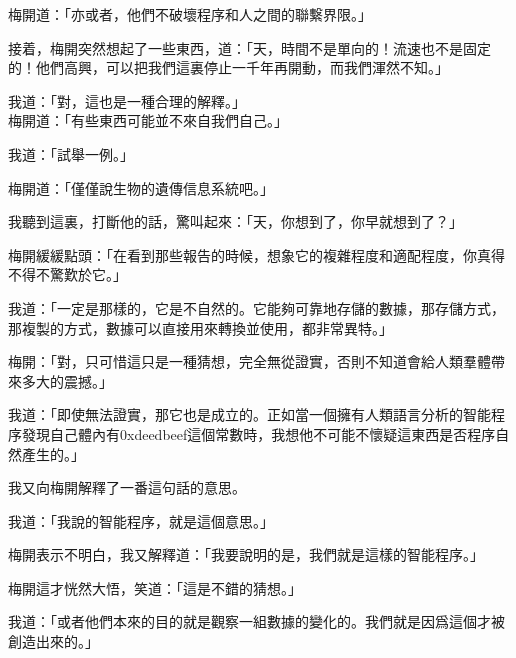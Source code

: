 梅開道：「亦或者，他們不破壞程序和人之間的聯繫界限。」

接着，梅開突然想起了一些東西，道：「天，時間不是單向的！流速也不是固定的！他們高興，可以把我們這裏停止一千年再開動，而我們渾然不知。」

我道：「對，這也是一種合理的解釋。」
\\


梅開道：「有些東西可能並不來自我們自己。」

我道：「試舉一例。」

梅開道：「僅僅說生物的遺傳信息系統吧。」

我聽到這裏，打斷他的話，驚叫起來：「天，你想到了，你早就想到了？」

梅開緩緩點頭：「在看到那些報告的時候，想象它的複雜程度和適配程度，你真得不得不驚歎於它。」

我道：「一定是那樣的，它是不自然的。它能夠可靠地存儲的數據，那存儲方式，那複製的方式，數據可以直接用來轉換並使用，都非常異特。」

梅開：「對，只可惜這只是一種猜想，完全無從證實，否則不知道會給人類羣體帶來多大的震撼。」

我道：「即使無法證實，那它也是成立的。正如當一個擁有人類語言分析的智能程序發現自己體內有0xdeedbeef這個常數時，我想他不可能不懷疑這東西是否程序自然產生的。」


我又向梅開解釋了一番這句話的意思。

我道：「我說的智能程序，就是這個意思。」

梅開表示不明白，我又解釋道：「我要說明的是，我們就是這樣的智能程序。」

梅開這才恍然大悟，笑道：「這是不錯的猜想。」

我道：「或者他們本來的目的就是觀察一組數據的變化的。我們就是因爲這個才被創造出來的。」

